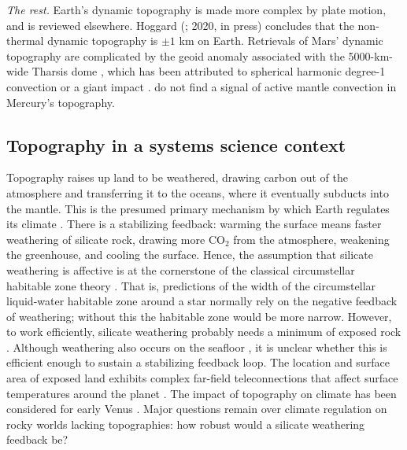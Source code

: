 






\vspace{0.5cm}

\textit{\color{teal1} The rest.} Earth's dynamic topography is made more complex by plate motion, and is reviewed elsewhere. Hoggard (\citeyear{Hoggard2016}; 2020, in press) concludes that the non-thermal dynamic topography is $\pm1$ km on Earth. Retrievals of Mars' dynamic topography are complicated by the geoid anomaly associated with the 5000-km-wide Tharsis dome \citep{Phillips2001, Wieczorek2004}, which has been attributed to spherical harmonic degree-1 convection \citep{Zhong2001} or a giant impact \citep{Reese2006, Andrews-Hanna2008}. \citet{James2014} do not find a signal of active mantle convection in Mercury's topography. 	





\subsection{Topography in a systems science context}

Topography raises up land to be weathered, drawing carbon out of the atmosphere and transferring it to the oceans, where it eventually subducts into the mantle. This is the presumed primary mechanism by which Earth regulates its climate \citep{Walker1981}. There is a stabilizing feedback: warming the surface means faster weathering of silicate rock, drawing more CO$_2$ from the atmosphere, weakening the greenhouse, and cooling the surface. Hence, the assumption that silicate weathering is affective is at the cornerstone of the classical circumstellar habitable zone theory \citep{Kasting1993}. That is, predictions of the width of the circumstellar liquid-water habitable zone around a star normally rely on the negative feedback of weathering; without this the habitable zone would be more narrow. However, to work efficiently, silicate weathering probably needs a minimum of exposed rock \citep{Abbot2012}. Although weathering also occurs on the seafloor \citep{Krissansen-Totton2017}, it is unclear whether this is efficient enough to sustain a stabilizing feedback loop. The location and surface area of exposed land exhibits complex far-field teleconnections that affect surface temperatures around the planet \citep{Sohl2017}. The impact of topography on climate has been considered for early Venus \citep{Way2016}. Major questions remain over climate regulation on rocky worlds lacking topographies: how robust would a silicate weathering feedback be? 

